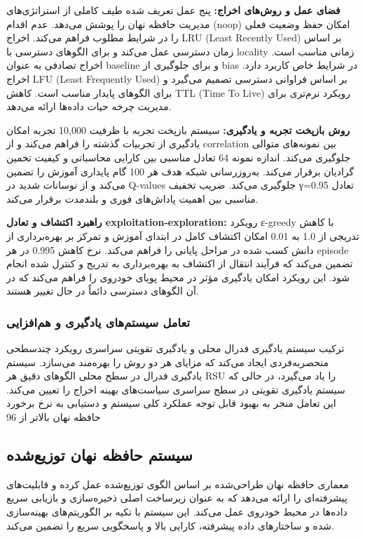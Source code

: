 \documentclass[11pt]{article}
\begin{document}
\textbf{فضای عمل و روش‌های اخراج:} پنج عمل تعریف شده طیف کاملی از استراتژی‌های مدیریت حافظه نهان را پوشش می‌دهد. عدم اقدام (noop) امکان حفظ وضعیت فعلی را در شرایط مطلوب فراهم می‌کند. اخراج LRU (Least Recently Used) بر اساس زمان دسترسی عمل می‌کند و برای الگوهای دسترسی با locality زمانی مناسب است. اخراج تصادفی به عنوان baseline و برای جلوگیری از bias در شرایط خاص کاربرد دارد. اخراج LFU (Least Frequently Used) بر اساس فراوانی دسترسی تصمیم می‌گیرد و برای الگوهای پایدار مناسب است. کاهش TTL (Time To Live) رویکرد نرم‌تری برای مدیریت چرخه حیات داده‌ها ارائه می‌دهد.

\textbf{روش بازپخت تجربه و یادگیری:} سیستم بازپخت تجربه با ظرفیت 10,000 تجربه امکان یادگیری از تجربیات گذشته را فراهم می‌کند و از correlation بین نمونه‌های متوالی جلوگیری می‌کند. اندازه نمونه 64 تعادل مناسبی بین کارایی محاسباتی و کیفیت تخمین گرادیان برقرار می‌کند. به‌روزرسانی شبکه هدف هر 100 گام پایداری آموزش را تضمین می‌کند و از نوسانات شدید در Q-values جلوگیری می‌کند. ضریب تخفیف γ=0.95 تعادل مناسبی بین اهمیت پاداش‌های فوری و بلندمدت برقرار می‌کند.

\textbf{راهبرد اکتشاف و تعادل exploitation-exploration:} رویکرد ε-greedy با کاهش تدریجی از 1.0 به 0.01 امکان اکتشاف کامل در ابتدای آموزش و تمرکز بر بهره‌برداری از دانش کسب شده در مراحل پایانی را فراهم می‌کند. نرخ کاهش 0.995 در هر episode تضمین می‌کند که فرآیند انتقال از اکتشاف به بهره‌برداری به تدریج و کنترل شده انجام شود. این رویکرد امکان یادگیری مؤثر در محیط پویای خودروی را فراهم می‌کند که در آن الگوهای دسترسی دائماً در حال تغییر هستند.

\subsubsection{تعامل سیستم‌های یادگیری و هم‌افزایی}

ترکیب سیستم یادگیری فدرال محلی و یادگیری تقویتی سراسری رویکرد چندسطحی منحصربه‌فردی ایجاد می‌کند که مزایای هر دو روش را بهره‌مند می‌سازد. سیستم یادگیری فدرال در سطح محلی الگوهای دقیق هر RSU را یاد می‌گیرد، در حالی که سیستم یادگیری تقویتی در سطح سراسری سیاست‌های بهینه اخراج را تعیین می‌کند. این تعامل منجر به بهبود قابل توجه عملکرد کلی سیستم و دستیابی به نرخ برخورد حافظه نهان بالاتر از 96%

\subsection{سیستم حافظه نهان توزیع‌شده}

معماری حافظه نهان طراحی‌شده بر اساس الگوی توزیع‌شده عمل کرده و قابلیت‌های پیشرفته‌ای را ارائه می‌دهد که به عنوان زیرساخت اصلی ذخیره‌سازی و بازیابی سریع داده‌ها در محیط خودروی عمل می‌کند. این سیستم با تکیه بر الگوریتم‌های بهینه‌سازی شده و ساختارهای داده پیشرفته، کارایی بالا و پاسخگویی سریع را تضمین می‌کند.
\end{document}
